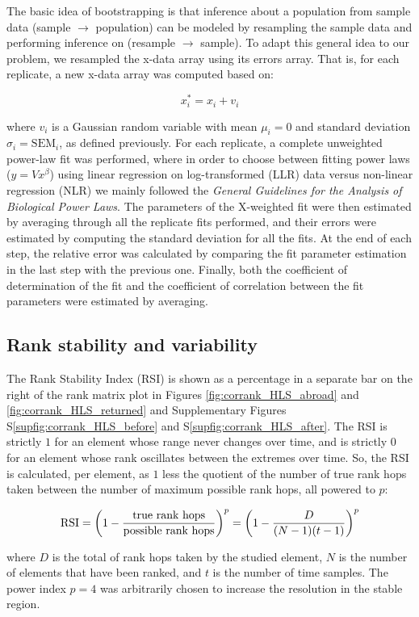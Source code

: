 The basic idea of bootstrapping is that inference about a population from sample data (sample $\rightarrow$ population) can be modeled by resampling the sample data and performing inference on (resample $\rightarrow$ sample)\cite{boot}. To adapt this general idea to our problem, we resampled the x-data array using its errors array. That is, for each replicate, a new x-data array was computed based on:
\begin{linenomath}
$$x^*_i = x_i + v_i$$
\end{linenomath}
where $v_i$ is a Gaussian random variable with mean $\mu_i=0$ and standard deviation $\sigma_i=\mathrm{SEM}_i$, as defined previously. For each replicate, a complete unweighted power-law fit was performed, where in order to choose between fitting power laws ($y=Vx^\beta$) using linear regression on log-transformed (LLR) data versus non-linear regression (NLR) we mainly followed the \emph{General Guidelines for the Analysis of Biological Power Laws}\cite{biopwrlaw}. The parameters of the X-weighted fit were then estimated by averaging through all the replicate fits performed, and their errors were estimated by computing the standard deviation for all the fits. At the end of each step, the relative error was calculated by comparing the fit parameter estimation in the last step with the previous one. Finally, both the coefficient of determination of the fit and the coefficient of correlation between the fit parameters were estimated by averaging.

\subsection*{Rank stability and variability}\label{sec:RSI}

The Rank Stability Index (RSI) is shown as a percentage in a separate bar on the right of the rank matrix plot in Figures \ref{fig:corrank_HLS_abroad} and \ref{fig:corrank_HLS_returned} and Supplementary Figures S\ref{supfig:corrank_HLS_before} and S\ref{supfig:corrank_HLS_after}. The RSI is strictly $1$ for an element whose range never changes over time, and is strictly $0$ for an element whose rank oscillates between the extremes over time. So, the RSI is calculated, per element, as $1$ less the quotient of the number of true rank hops taken between the number of maximum possible rank hops, all powered to $p$:
\begin{linenomath}
$${\rm RSI} = \left(1-\frac{\text{true rank hops}}{\text{possible rank hops}}\right)^p = \left(1-\frac{D}{(N-1)(t-1)}\right)^p$$
\end{linenomath}
where $D$ is the total of rank hops taken by the studied element, $N$ is the number of elements that have been ranked, and $t$ is the number of time samples. The power index $p=4$ was arbitrarily chosen to increase the resolution in the stable region.

